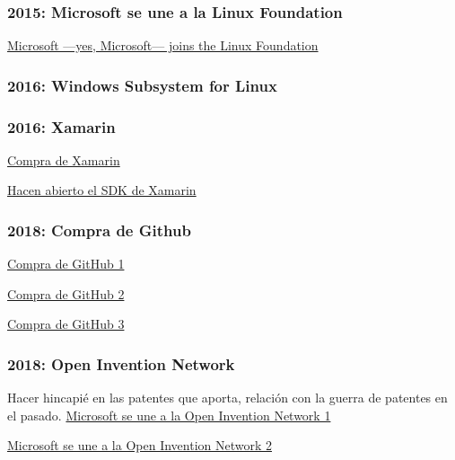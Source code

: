 \subsubsection{2015: Microsoft se une a la Linux Foundation}
 \href{hhttps://arstechnica.com/information-technology/2016/11/microsoft-yes-microsoft-joins-the-linux-foundation/}{Microsoft ---yes, Microsoft--- joins the Linux Foundation}

\subsubsection{2016: Windows Subsystem for Linux}


\subsubsection{2016: Xamarin}
\href{https://www.genbeta.com/desarrollo/microsoft-adquiere-xamarin}{Compra de Xamarin}

\href{https://www.petri.com/microsofts-newly-acquired-xamarin-expands-developer-tools-new-features}{Hacen abierto el SDK de Xamarin}

\subsubsection{2018: Compra de Github}
\href{https://www.xataka.com/aplicaciones/oficial-microsoft-compra-github-7-500-millones-dolares}{Compra de GitHub 1}

\href{https://www.elconfidencial.com/tecnologia/2018-06-04/microsoft-ahora-ama-el-software-libre-compra-la-startup-github-por-7-500-millones_1573704/}{Compra de GitHub 2}

\href{https://www.xataka.com/aplicaciones/microsoft-punto-adquirir-github-desarrolladores-desarrolladores-desarrolladores}{Compra de GitHub 3}

\subsubsection{2018: Open Invention Network}
Hacer hincapié en las patentes que aporta, relación con la guerra de patentes en el pasado.
\href{https://azure.microsoft.com/en-us/blog/microsoft-joins-open-invention-network-to-help-protect-linux-and-open-source/}{Microsoft se une a la Open Invention Network 1}

\href{https://www.zdnet.com/article/what-does-microsoft-joining-the-open-invention-network-mean-for-you/}{Microsoft se une a la Open Invention Network 2}


